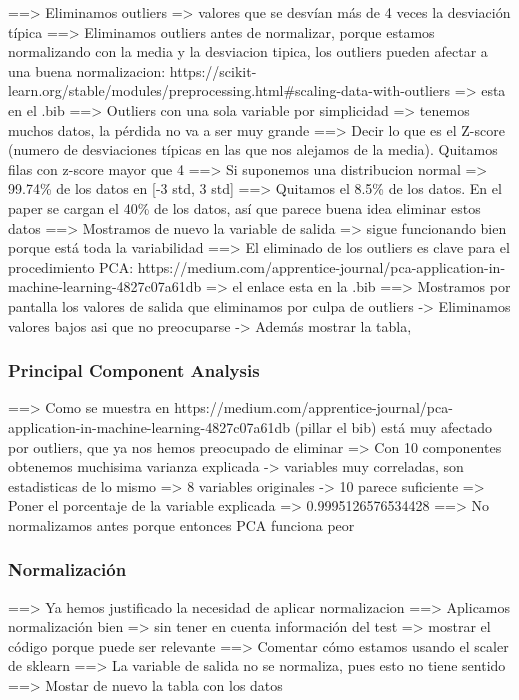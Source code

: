 \documentclass[11pt]{article}
\begin{document}
==> Eliminamos outliers => valores que se desvían más de 4 veces la desviación típica
==> Eliminamos outliers antes de normalizar, porque estamos normalizando con la media y la desviacion tipica, los outliers pueden afectar a una buena normalizacion: https://scikit-learn.org/stable/modules/preprocessing.html\#scaling-data-with-outliers => esta en el .bib
==> Outliers con una sola variable por simplicidad => tenemos muchos datos, la pérdida no va a ser muy grande
==> Decir lo que es el Z-score (numero de desviaciones típicas en las que nos alejamos de la media). Quitamos filas con z-score mayor que 4
==> Si suponemos una distribucion normal => 99.74\% de los datos en [-3 std, 3 std]
==> Quitamos el 8.5\% de los datos. En el paper se cargan el 40\% de los datos, así que parece buena idea eliminar estos datos
==> Mostramos de nuevo la variable de salida => sigue funcionando bien porque está toda la variabilidad
==> El eliminado de los outliers es clave para el procedimiento PCA: https://medium.com/apprentice-journal/pca-application-in-machine-learning-4827c07a61db => el enlace esta en la .bib
==> Mostramos por pantalla los valores de salida que eliminamos por culpa de outliers -> Eliminamos valores bajos asi que no preocuparse -> Además mostrar la tabla,

\subsubsection{Principal Component Analysis}

==> Como se muestra en https://medium.com/apprentice-journal/pca-application-in-machine-learning-4827c07a61db (pillar el bib) está muy afectado por outliers, que ya nos hemos preocupado de eliminar
=> Con 10 componentes obtenemos muchisima varianza explicada -> variables muy correladas, son estadisticas de lo mismo
=> 8 variables originales -> 10 parece suficiente
=> Poner el porcentaje de la variable explicada
        => 0.9995126576534428
==> No normalizamos antes porque entonces PCA funciona peor

\subsubsection{Normalización}

==> Ya hemos justificado la necesidad de aplicar normalizacion
==> Aplicamos normalización bien => sin tener en cuenta información del test => mostrar el código porque puede ser relevante
==> Comentar cómo estamos usando el scaler de sklearn
==> La variable de salida no se normaliza, pues esto no tiene sentido
==> Mostar de nuevo la tabla con los datos
\end{document}
